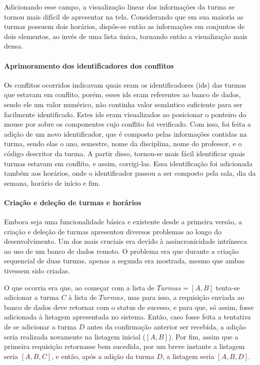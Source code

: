 Adicionando esse campo, a visualização linear das informações da turma se tornou mais difícil de apresentar na tela. Considerando que em sua maioria as turmas possuem dois horários, dispôs-se então as informações em conjuntos de dois elementos, ao invés de uma lista única, tornando então a visualização mais densa.

\paragraph*{Aprimoramento dos identificadores dos conflitos}

Os conflitos ocorridos indicavam quais eram os identificadores (ids) das turmas que estavam em conflito, porém, esses ids eram referentes ao banco de dados, sendo ele um valor numérico, não continha valor semântico suficiente para ser facilmente identificado. Estes ids eram visualizados ao posicionar o ponteiro do mouse por sobre os componentes cujo conflito foi verificado. Com isso, foi feita a adição de um novo identificador, que é composto pelas informações contidas na turma, sendo elas o ano, semestre, nome da disciplina, nome do professor, e o código descritor da turma. A partir disso, tornou-se mais fácil identificar quais turmas estavam em conflito, e assim, corrigi-las. Essa identificação foi adicionada também aos horários, onde o identificador passou a ser composto pela sala, dia da semana, horário de início e fim.

\paragraph*{Criação e deleção de turmas e horários}

Embora seja uma funcionalidade básica e existente desde a primeira versão, a criação e deleção de turmas apresentou diversos problemas ao longo do desenvolvimento. Um dos mais cruciais era devido à assincronicidade intrínseca ao uso de um banco de dados remoto. O problema era que durante a criação sequencial de duas turmas, apenas a segunda era mostrada, mesmo que ambas tivessem sido criadas.

O que ocorria era que, ao começar com a lista de $Turmas = [A, B]$ tenta-se adicionar a turma $C$ à lista de $Turmas$, mas para isso, a requisição enviada ao banco de dados deve retornar com o status de sucesso, e para que, só assim, fosse adicionada à listagem apresentada no sistema. Então, caso fosse feita a tentativa de se adicionar a turma $D$ antes da confirmação anterior ser recebida, a adição seria realizada novamente na listagem inicial ($[A, B]$). Por fim, assim que a primeira requisição retornasse bem sucedida, por um breve instante a listagem seria $[A, B, C]$, e então, após a adição da turma $D$, a listagem seria $[A, B, D]$.

